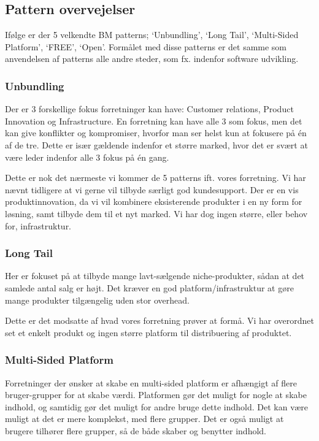 \subsection{Pattern overvejelser}


Ifølge \citet[pp. 52-119]{osterwalder2009business} er der 5 velkendte BM patterns; `Unbundling', `Long Tail', `Multi-Sided Platform', `FREE', `Open'.
Formålet med disse patterns er det samme som anvendelsen af patterns alle andre steder, som fx. indenfor software udvikling.

\subsubsection{Unbundling}
Der er 3 forskellige fokus forretninger kan have: Customer relations, Product Innovation og Infrastructure.
En forretning kan have alle 3 som fokus, men det kan give konflikter og kompromiser, hvorfor man ser helst kun at fokusere på én af de tre.
Dette er især gældende indenfor et større marked, hvor det er svært at være leder indenfor alle 3 fokus på én gang.

Dette er nok det nærmeste vi kommer de 5 patterns ift. vores forretning.
Vi har nævnt tidligere at vi gerne vil tilbyde særligt god kundesupport.
Der er en vis produktinnovation, da vi vil kombinere eksisterende produkter i en ny form for løsning, samt tilbyde dem til et nyt marked.
Vi har dog ingen større, eller behov for, infrastruktur.

\subsubsection{Long Tail}
Her er fokuset på at tilbyde mange lavt-sælgende niche-produkter, sådan at det samlede antal salg er højt.
Det kræver en god platform/infrastruktur at gøre mange produkter tilgængelig uden stor overhead.

Dette er det modsatte af hvad vores forretning prøver at formå.
Vi har overordnet set et enkelt produkt og ingen større platform til distribuering af produktet.

\subsubsection{Multi-Sided Platform}
Forretninger der ønsker at skabe en multi-sided platform er afhængigt af flere bruger-grupper for at skabe værdi.
Platformen gør det muligt for nogle at skabe indhold, og samtidig gør det muligt for andre bruge dette indhold.
Det kan være muligt at det er mere komplekst, med flere grupper.
Det er også muligt at brugere tilhører flere grupper, så de både skaber og benytter indhold.


